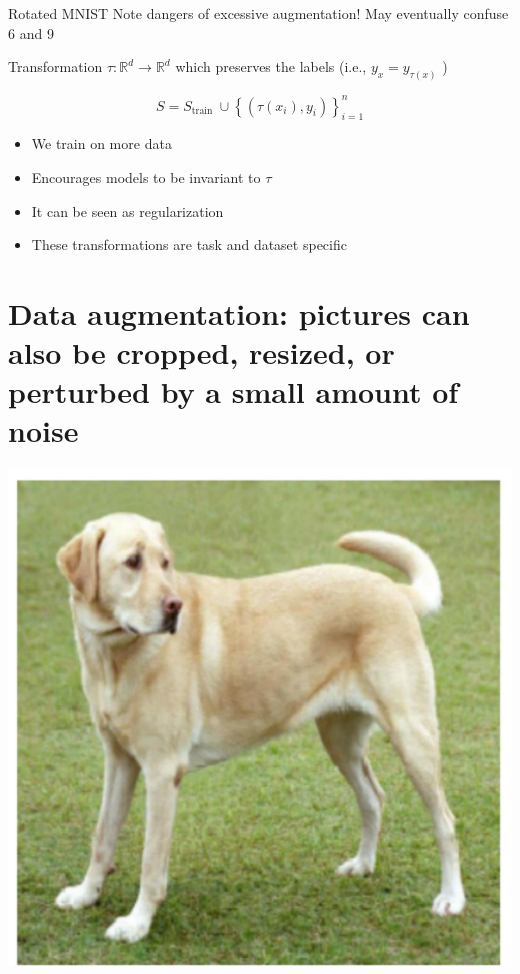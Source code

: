 \documentclass[10pt]{article}
\begin{document}
Rotated MNIST
Note dangers of excessive augmentation! May eventually confuse 6 and 9

Transformation $\tau: \mathbb{R}^{d} \rightarrow \mathbb{R}^{d}$ which preserves the labels (i.e., $y_{x}=y_{\tau(x)}$ )

$$
S=S_{\text {train }} \cup\left\{\left(\tau\left(x_{i}\right), y_{i}\right)\right\}_{i=1}^{n}
$$

\begin{itemize}
  \item We train on more data

  \item Encourages models to be invariant to $\tau$

  \item It can be seen as regularization

  \item These transformations are task and dataset specific

\end{itemize}

\section*{Data augmentation: pictures can also be cropped, resized, or perturbed by a small amount of noise}
\begin{center}
\includegraphics[max width=\textwidth]{2024_01_08_959e2db67a31f073f6d2g-24(3)}
\end{center}
\end{document}
